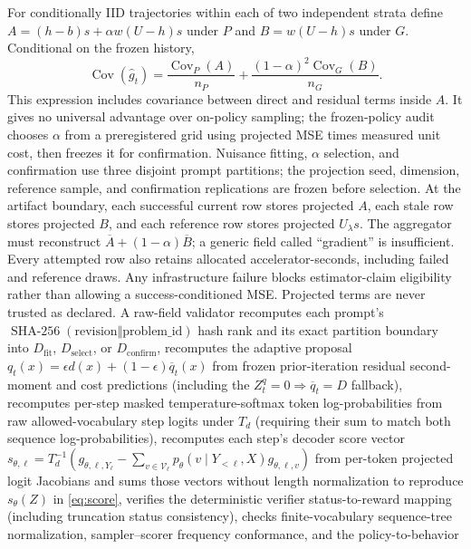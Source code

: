 \documentclass{article}
\begin{document}
For conditionally IID trajectories within each of two independent strata define
$A=(h-b)s+\alpha w(U-h)s$ under $P$ and
$B=w(U-h)s$ under $G$. Conditional on the frozen history,
\begin{equation}
\operatorname{Cov}(\widehat g_t)=
\frac{\operatorname{Cov}_P(A)}{n_P}+
\frac{(1-\alpha)^2\operatorname{Cov}_G(B)}{n_G}.
\label{eq:variance}
\end{equation}
This expression includes covariance between direct and residual terms inside
$A$. It gives no universal advantage over on-policy sampling; the
frozen-policy audit chooses $\alpha$ from a preregistered grid using projected
MSE times measured unit cost, then freezes it for confirmation. Nuisance fitting,
$\alpha$ selection, and confirmation use three disjoint prompt partitions; the
projection seed, dimension, reference sample, and confirmation replications
are frozen before selection.
At the artifact boundary, each successful current row stores projected $A$,
each stale row stores projected $B$, and each reference row stores projected
$U_\lambda s$. The aggregator must reconstruct
$\overline A+(1-\alpha)\overline B$; a generic field called ``gradient'' is
insufficient. Every attempted row also retains allocated accelerator-seconds,
including failed and reference draws. Any infrastructure failure blocks
estimator-claim eligibility rather than allowing a success-conditioned MSE.
Projected terms are never trusted as declared. A raw-field validator
recomputes each prompt's $\operatorname{SHA-256}(\text{revision}\Vert
\text{problem\_id})$ hash rank and its exact partition boundary into
$D_{\mathrm{fit}}$, $D_{\mathrm{select}}$, or $D_{\mathrm{confirm}}$,
recomputes the adaptive proposal $q_t(x)=\epsilon d(x)+(1-\epsilon)\overline q_t(x)$
from frozen prior-iteration residual second-moment and cost predictions
(including the $Z_t^q=0\Rightarrow\overline q_t=D$ fallback), recomputes
per-step masked temperature-softmax token log-probabilities from raw
allowed-vocabulary step logits under $T_d$ (requiring their sum to match both
sequence log-probabilities), recomputes each step's decoder score vector
$s_{\theta,\ell}=T_d^{-1}(g_{\theta,\ell,Y_\ell}
-\sum_{v\in\mathcal V_\ell}p_\theta(v\mid Y_{<\ell},X)g_{\theta,\ell,v})$
from per-token projected logit Jacobians and sums those vectors without length
normalization to reproduce $s_\theta(Z)$ in \cref{eq:score}, verifies the
deterministic verifier status-to-reward mapping (including truncation status
consistency), checks finite-vocabulary sequence-tree
normalization, sampler--scorer frequency conformance, and the policy-to-behavior
\end{document}
